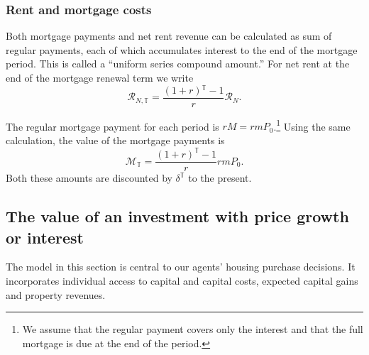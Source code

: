 








 
\subsubsection{Rent and mortgage costs}
Both mortgage payments and net rent revenue can be calculated as sum of regular payments, each of which accumulates interest to the end of the mortgage period. This is called a ``uniform series compound amount.'' \cite{sullivanEngineeringEconomy2003} For net rent at the end of the mortgage renewal term we write
\begin{equation}
\mathcal{R}_{N, \mathbb{T}}= \frac{(1+r)\mathbb{^\mathbb{T}}-1}{r}\mathcal{R}_N.     
\end{equation}

The regular mortgage payment for each period is $rM=rmP_0$.\footnote{We assume that the regular payment covers only the interest and that the full mortgage is due at the end of the period.} Using the same calculation, the value of the mortgage payments is 
\begin{equation}
\mathcal{M}_{\mathbb{T}} = \frac{(1+r)^\mathbb{T}-1}{r}rmP_0. 
\end{equation}
Both these amounts are discounted by $\delta^\mathbb{T}$ to the present. %
 
\subsection{The value of an investment with price growth or interest}
 The model in this section is central to our agents' housing purchase decisions. It incorporates individual access to capital and capital costs, expected capital gains and property revenues.  
 
